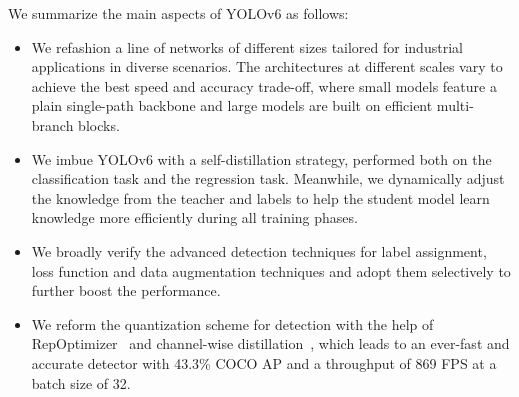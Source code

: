 \documentclass[10pt,twocolumn,letterpaper]{article}
\begin{document}
We summarize the main aspects of YOLOv6 as follows:
\begin{itemize}
\item We refashion a line of networks of different sizes tailored for industrial applications in diverse scenarios. The architectures at different scales vary to achieve the best speed and accuracy trade-off, where small models feature a plain single-path backbone and large models are built on efficient multi-branch blocks.
\item We imbue YOLOv6 with a self-distillation strategy, performed both on the classification task and the regression task. Meanwhile, we dynamically adjust the knowledge from the teacher and labels to help the student model learn knowledge more efficiently during all training phases.
\item We broadly verify the advanced detection techniques for label assignment, loss function and data augmentation techniques and adopt them selectively to further boost the performance.
\item We reform the quantization scheme for detection with the help of RepOptimizer~\cite{ding2022re} and channel-wise distillation~\cite{shu2021channel}, which leads to an ever-fast and accurate detector with 43.3\% COCO AP and a throughput of 869 FPS at a batch size of 32. 
\end{itemize}

  
\end{document}
